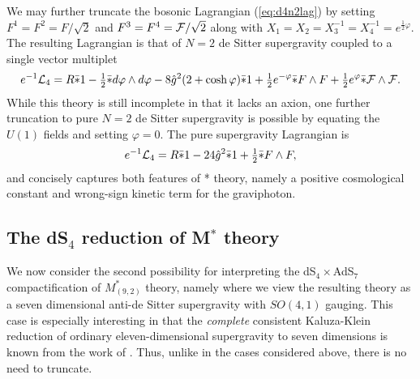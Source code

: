 \documentclass[a4paper,12pt]{article}
\newcommand{\fft}[2]{{\frac{#1}{#2}}}
\newcommand{\ft}[2]{{\textstyle\frac{#1}{#2}}}
\begin{document}
We may further truncate the bosonic Lagrangian (\ref{eq:d4n2lag}) by
setting $F^1=F^2=F/\sqrt{2}$ and $F^3=F^4={\cal F}/\sqrt{2}$ along with
$X_1=X_2=X_3^{-1}=X_4^{-1}=e^{\fft12\varphi}$.  The resulting
Lagrangian is that of $N=2$ de Sitter supergravity coupled to a single
vector multiplet
%
\begin{equation}
e^{-1}{\cal L}_4 = R\bar *1-\ft12\bar*d\varphi\wedge d\varphi
-8\hat g^2(2+\cosh\varphi)\bar*1
+\ft12e^{-\varphi}\bar*F\wedge F +\ft12e^{\varphi}\bar*{\cal F}\wedge
{\cal F}.
\label{eq:d4n2lag2}
\end{equation}
%
While this theory is still incomplete in that it lacks an axion, one
further truncation to pure $N=2$ de Sitter supergravity is possible by
equating the $U(1)$ fields and setting $\varphi=0$.  The pure
supergravity Lagrangian is
%
\begin{equation}
e^{-1}{\cal L}_4 = R\bar *1 -24\hat g^2\bar*1 +\ft12\bar*F\wedge F,
\label{eq:d4n2lag3}
\end{equation}
%
and concisely captures both features of * theory, namely a positive
cosmological constant and wrong-sign kinetic term for the graviphoton.

\subsection{The dS$_4$ reduction of M$^*$ theory}

We now consider the second possibility for interpreting the
dS$_4\times$AdS$_7$ compactification of $M^*_{(9,2)}$ theory, namely
where we view the resulting theory as a seven dimensional anti-de
Sitter supergravity with $SO(4,1)$ gauging.  This case is especially
interesting in that the {\it complete} consistent Kaluza-Klein
reduction of ordinary eleven-dimensional supergravity to seven
dimensions is known from the work of \cite{Nastase:1999cb,Nastase}.
Thus, unlike in the cases considered above, there is no need to
truncate.
\end{document}
